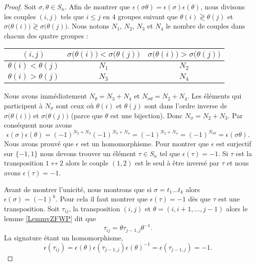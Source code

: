 \begin{proof}
    Soit \( \sigma,\theta \in S_n\). Afin de montrer que \( \epsilon(\sigma\theta )=\epsilon(\sigma)\epsilon(\theta )\), nous divisons les couples \( (i,j)\) tels que \( i\leq j\) en \( 4\) groupes suivant que \( \theta(i)\gtrless \theta(j)\) et \( \sigma\big( \theta(i) \big)\gtrless \sigma\big( \theta(j) \big)\). Nous notons \( N_1\), \( N_2\), \( N_3\) et \( N_4\) le nombre de couples dans chacun des quatre groupes :
    \begin{center}
    \begin{tabular}{c|c|c}
        $ (i,j)$&   \(\sigma\big( \theta(i) \big)<\sigma\big( \theta(j) \big)\)    &   \(\sigma\big( \theta(i) \big)>\sigma\big( \theta(j) \big)\)\\
        \hline
        \( \theta(i)<\theta(j)\)& \( N_1\)&\( N_2\)\\
        \hline
        \( \theta(i)>\theta(j)\)&\( N_3\)&\( N_4\)
    \end{tabular}
    \end{center}
    Nous avons immédiatement \( N_\theta=N_3+N_4\) et \( N_{\sigma\theta}=N_2+N_4\). Les éléments qui participent à \( N_\sigma\) sont ceux où \( \theta(i)\) et \(\theta(j)\) sont dans l'ordre inverse de \( \sigma\big( \theta(i) \big)\) et \( \sigma\big( \theta(j) \big)\) (parce que \(  \theta\) est une bijection). Donc \( N_\sigma=N_2+N_3\). Par conséquent nous avons
    \begin{equation}
        \epsilon(\sigma)\epsilon(\theta)=(-1)^{N_2+N_3}(-1)^{N_3+N_4}=(-1)^{N_2+N_4}=(-1)^{N_{\sigma\theta}}=\epsilon(\sigma\theta).
    \end{equation}
    Nous avons prouvé que \( \epsilon\) est un homomorphisme. Pour montrer que \( \epsilon\) est surjectif sur \( \{ -1,1 \}\) nous devons trouver un élément \( \tau\in S_n\) tel que \( \epsilon(\tau)=-1\). Si \( \tau\) est la transposition \( 1\leftrightarrow 2\) alors le couple \( (1,2)\) est le seul à être inversé par \( \tau\) et nous avons \( \epsilon(\tau)=-1\).
    
    Avant de montrer l'unicité, nous montrons que si \( \sigma=t_1\ldots t_k\) alors \( \epsilon(\sigma)=(-1)^k\). Pour cela il faut montrer que \( \epsilon(\tau)=-1\) dès que \( \tau\) est une transposition. Soit \( \tau_{ij}\), la transposition \( (i,j)\) et \( \theta=(i,i+1,\ldots, j-1)\) alors le lemme \ref{LemmvZFWP} dit que
    \begin{equation}
        \tau_{ij}=\theta\tau_{j-1,j}\theta^{-1}.
    \end{equation}
    La signature étant un homomorphisme,
    \begin{equation}
        \epsilon(\tau_{ij})=\epsilon(\theta)\epsilon(\tau_{j-1,j})\epsilon(\theta)^{-1}=\epsilon(\tau_{j-1,j})=-1.
    \end{equation}
    

\end{proof}
